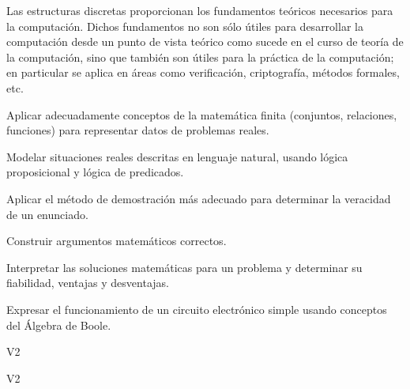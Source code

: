 \begin{syllabus}


\begin{justification}
Las estructuras discretas proporcionan los fundamentos teóricos necesarios para la computación.
Dichos fundamentos no son sólo útiles para desarrollar la computación desde un punto de vista teórico
como sucede en el curso de teoría de la computación,  sino que también son útiles para la práctica de la
computación; en particular se aplica en áreas como verificación, criptografía, métodos formales, etc.
\end{justification}

\begin{goals}
\item Aplicar adecuadamente conceptos de la matemática finita (conjuntos, relaciones, funciones) para representar datos de problemas reales.
\item Modelar situaciones reales descritas en lenguaje natural, usando lógica proposicional y lógica de predicados.
\item Aplicar el método de demostración más adecuado para determinar la veracidad de un enunciado.
\item Construir argumentos matemáticos correctos.
\item Interpretar las soluciones matemáticas para un problema y determinar su fiabilidad, ventajas y desventajas.
\item Expresar el funcionamiento de un circuito electrónico simple usando conceptos del Álgebra de Boole.
\end{goals}

\begin{outcomes}{V2}
    \item {}
    \item {}
\end{outcomes}
\begin{competences}{V2}
    \item {}
    \item {}
\end{competences}


\end{syllabus}
